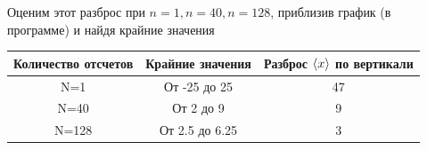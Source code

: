 \begin{enumerate}
Оценим этот разброс при $n=1, n=40, n=128$, приблизив график (в программе) и найдя крайние значения

\begin{table}[htbp]
	\centering
	\begin{tabular}{|c|c|c|}
		\toprule
		\textbf{Количество отсчетов} & \textbf{Крайние значения} & \multicolumn{1}{c|}{\textbf{Разброс $\langle x\rangle$ по вертикали}} \\
		\midrule
		N=1   & От -25 до 25 & 47 \\
		\midrule
		N=40  & От 2 до 9 & 9 \\
		\midrule
		N=128 & От 2.5 до 6.25 & 3 \\
		\bottomrule
	\end{tabular}%
	\label{tab:addlabel}%
\end{table}%
\end{enumerate}



